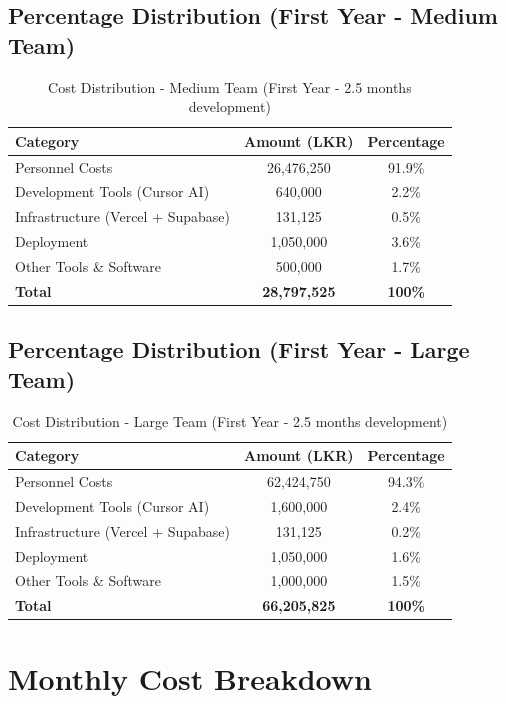 \documentclass[12pt,a4paper]{article}
\begin{document}
\subsection{Percentage Distribution (First Year - Medium Team)}

\begin{table}[H]
\centering
\begin{tabular}{|l|c|c|}
\hline
\textbf{Category} & \textbf{Amount (LKR)} & \textbf{Percentage} \\
\hline
Personnel Costs & 26,476,250 & 91.9\% \\
Development Tools (Cursor AI) & 640,000 & 2.2\% \\
Infrastructure (Vercel + Supabase) & 131,125 & 0.5\% \\
Deployment & 1,050,000 & 3.6\% \\
Other Tools \& Software & 500,000 & 1.7\% \\
\hline
\textbf{Total} & \textbf{28,797,525} & \textbf{100\%} \\
\hline
\end{tabular}
\caption{Cost Distribution - Medium Team (First Year - 2.5 months development)}
\end{table}

\subsection{Percentage Distribution (First Year - Large Team)}

\begin{table}[H]
\centering
\begin{tabular}{|l|c|c|}
\hline
\textbf{Category} & \textbf{Amount (LKR)} & \textbf{Percentage} \\
\hline
Personnel Costs & 62,424,750 & 94.3\% \\
Development Tools (Cursor AI) & 1,600,000 & 2.4\% \\
Infrastructure (Vercel + Supabase) & 131,125 & 0.2\% \\
Deployment & 1,050,000 & 1.6\% \\
Other Tools \& Software & 1,000,000 & 1.5\% \\
\hline
\textbf{Total} & \textbf{66,205,825} & \textbf{100\%} \\
\hline
\end{tabular}
\caption{Cost Distribution - Large Team (First Year - 2.5 months development)}
\end{table}

\section{Monthly Cost Breakdown}
\end{document}
